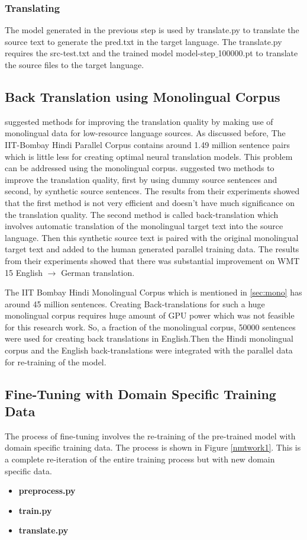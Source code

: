 \subsubsection{Translating}
The model generated in the previous step is used by translate.py to translate the source text to generate the pred.txt in the target language. The translate.py requires the src-test.txt and the trained model model-step$\_$100000.pt to  translate the source files to the target language. 

\subsection{Back Translation using Monolingual Corpus}
\cite{DBLP:journals/corr/SennrichHB15a} suggested methods for improving the translation quality by making use of monolingual data for low-resource language sources. As discussed before, The IIT-Bombay Hindi Parallel Corpus contains around 1.49 million sentence pairs which is little less for creating optimal neural translation models. This problem can be addressed using the monolingual corpus.\cite{DBLP:journals/corr/SennrichHB15a} suggested two methods to improve the translation quality, first by using dummy source sentences and second, by synthetic source sentences. The results from their experiments showed that the first method is not very efficient and doesn't have much significance on the translation quality. The second method is called back-translation which involves automatic translation of
the monolingual target text into the source language. Then this synthetic source text is paired with the original monolingual target text and added to the human generated parallel training data. The results from their experiments showed that there was substantial improvement on WMT 15 English $\rightarrow$ German translation. 

The IIT Bombay Hindi Monolingual Corpus which is mentioned in \ref{sec:mono} has around 45 million sentences. Creating Back-translations for such a huge monolingual corpus requires huge amount of GPU power which was not feasible for this research work. So, a fraction of the monolingual corpus, 50000 sentences were used for creating back translations in English.Then the Hindi monolingual corpus and the English back-translations were integrated with the parallel data for re-training of the model.

\subsection{Fine-Tuning with Domain Specific Training Data}
The process of fine-tuning involves the re-training of the pre-trained model with domain specific training data. The process is shown in Figure \ref{nmtwork1}. This is a complete re-iteration of the entire training process but with new domain specific data.
\begin{itemize}
    \item \textbf{preprocess.py}
    \item\textbf{train.py}
    \item\textbf{translate.py}
\end{itemize}

